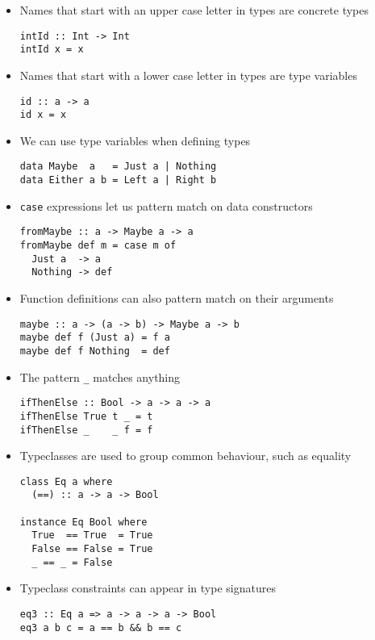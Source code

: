 \begin{itemize}
\item Names that start with an upper case letter in types are concrete
  types
\begin{verbatim}
intId :: Int -> Int
intId x = x
\end{verbatim}

\item Names that start with a lower case letter in types are type
  variables
\begin{verbatim}
id :: a -> a
id x = x
\end{verbatim}

\item We can use type variables when defining types
\begin{verbatim}
data Maybe  a   = Just a | Nothing
data Either a b = Left a | Right b
\end{verbatim}

\item \verb|case| expressions let us pattern match on data
  constructors
\begin{verbatim}
fromMaybe :: a -> Maybe a -> a
fromMaybe def m = case m of
  Just a  -> a
  Nothing -> def
\end{verbatim}

\item Function definitions can also pattern match on their arguments
\begin{verbatim}
maybe :: a -> (a -> b) -> Maybe a -> b
maybe def f (Just a) = f a
maybe def f Nothing  = def
\end{verbatim}

\item The pattern \verb|_| matches anything
\begin{verbatim}
ifThenElse :: Bool -> a -> a -> a
ifThenElse True t _ = t
ifThenElse _    _ f = f
\end{verbatim}

\item Typeclasses are used to group common behaviour, such as equality
\begin{verbatim}
class Eq a where
  (==) :: a -> a -> Bool

instance Eq Bool where
  True  == True  = True
  False == False = True
  _ == _ = False
\end{verbatim}

\item Typeclass constraints can appear in type signatures
\begin{verbatim}
eq3 :: Eq a => a -> a -> a -> Bool
eq3 a b c = a == b && b == c
\end{verbatim}


\end{itemize}
